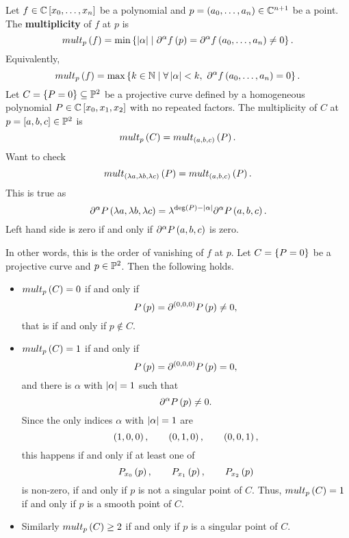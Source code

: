 \begin{definition}
Let $ f \in \C\sb{x_0, \dots, x_n} $ be a polynomial and $ p = \rb{a_0, \dots, a_n} \in \C^{n + 1} $ be a point. The \textbf{multiplicity} of $ f $ at $ p $ is
$$ mult_p\rb{f} = \min\cb{\abs{\alpha} \mid \partial^\alpha f\rb{p} = \partial^\alpha f\rb{a_0, \dots, a_n} \ne 0}. $$
Equivalently,
$$ mult_p\rb{f} = \max\cb{k \in \N \mid \forall \abs{\alpha} < k, \ \partial^\alpha f\rb{a_0, \dots, a_n} = 0}. $$
Let $ C = \cb{P = 0} \subseteq \P^2 $ be a projective curve defined by a homogeneous polynomial $ P \in \C\sb{x_0, x_1, x_2} $ with no repeated factors. The multiplicity of $ C $ at $ p = \sb{a, b, c} \in \P^2 $ is
$$ mult_p\rb{C} = mult_{\rb{a, b, c}}\rb{P}. $$
Want to check
$$ mult_{\rb{\lambda a, \lambda b, \lambda c}}\rb{P} = mult_{\rb{a, b, c}}\rb{P}. $$
This is true as
$$ \partial^\alpha P\rb{\lambda a, \lambda b, \lambda c} = \lambda^{\deg\rb{P} - \abs{\alpha}}\partial^\alpha P\rb{a, b, c}. $$
Left hand side is zero if and only if $ \partial^\alpha P\rb{a, b, c} $ is zero.
\end{definition}

\pagebreak


In other words, this is the order of vanishing of $ f $ at $ p $. Let $ C = \cb{P = 0} $ be a projective curve and $ p \in \P^2 $. Then the following holds.
\begin{itemize}
\item $ mult_p\rb{C} = 0 $ if and only if
$$ P\rb{p} = \partial^{\rb{0, 0, 0}} P\rb{p} \ne 0, $$
that is if and only if $ p \notin C $.
\item $ mult_p\rb{C} = 1 $ if and only if
$$ P\rb{p} = \partial^{\rb{0, 0, 0}} P\rb{p} = 0, $$
and there is $ \alpha $ with $ \abs{\alpha} = 1 $ such that
$$ \partial^{\alpha} P\rb{p} \ne 0. $$
Since the only indices $ \alpha $ with $ \abs{\alpha} = 1 $ are
$$ \rb{1, 0, 0}, \qquad \rb{0, 1, 0}, \qquad \rb{0, 0, 1}, $$
this happens if and only if at least one of
$$ P_{x_0}\rb{p}, \qquad P_{x_1}\rb{p}, \qquad P_{x_2}\rb{p} $$
is non-zero, if and only if $ p $ is not a singular point of $ C $. Thus, $ mult_p\rb{C} = 1 $ if and only if $ p $ is a smooth point of $ C $.
\item Similarly $ mult_p\rb{C} \ge 2 $ if and only if $ p $ is a singular point of $ C $.
\end{itemize}

